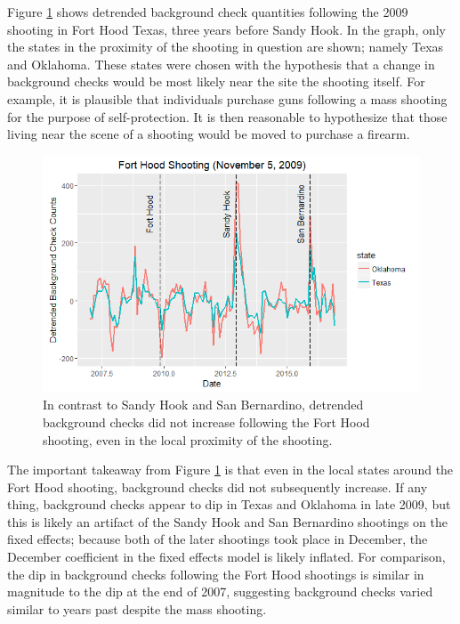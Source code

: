 \documentclass[9pt,twocolumn,twoside,lineno]{pnas-new}
\begin{document}
Figure \ref{fig:fort-hood} shows detrended background check quantities following the 2009 shooting in Fort Hood Texas, three years before Sandy Hook. In the graph, only the states in the proximity of the shooting in question are shown; namely Texas and Oklahoma. These states were chosen with the hypothesis that a change in background checks would be most likely near the site the shooting itself. For example, it is plausible that individuals purchase guns following a mass shooting for the purpose of self-protection. It is then reasonable to hypothesize that those living near the scene of a shooting would be moved to purchase a firearm. 
\begin{figure}
  \centering
  \includegraphics[width=\linewidth]{figures/fort-hood}
  \caption{In contrast to Sandy Hook and San Bernardino, detrended background checks did not increase following the Fort Hood shooting, even in the local proximity of the shooting.}
  \label{fig:fort-hood}
\end{figure}
The important takeaway from Figure \ref{fig:fort-hood} is that even in the local states around the Fort Hood shooting, background checks did not subsequently increase. If any thing, background checks appear to dip in Texas and Oklahoma in late 2009, but this is likely an artifact of the Sandy Hook and San Bernardino shootings on the fixed effects; because both of the later shootings took place in December, the December coefficient in the fixed effects model is likely inflated. For comparison, the dip in background checks following the Fort Hood shootings is similar in magnitude to the dip at the end of 2007, suggesting background checks varied similar to years past despite the mass shooting. 
\end{document}
